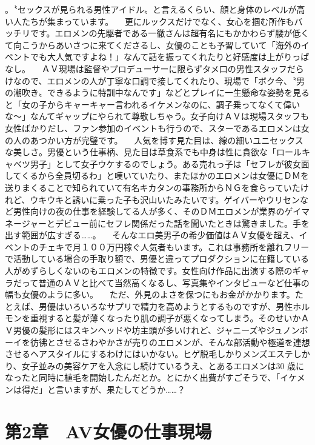 \documentclass[12pt,UTF8]{ctexbook}
\begin{document}
。〝セックスが見られる男性アイドル〟と言えるくらい、顔と身体のレベルが高い人たちが集まっています。
　更にルックスだけでなく、女心を掴む所作もバッチリです。エロメンの先駆者である一徹さんは超有名にもかかわらず腰が低くて向こうからあいさつに来てくださるし、女優のことも予習していて「海外のイベントでも大人気ですよね！」なんて話を振ってくれたりと好感度は上がりっぱなし。
　ＡＶ現場は監督やプロデューサーに限らずタメ口の男性スタッフだらけなので、エロメンの人が丁寧な口調で接してくれたり、現場で「ボク今、〝男の潮吹き〟できるように特訓中なんです」などとプレイに一生懸命な姿勢を見ると「女の子からキャーキャー言われるイケメンなのに、調子乗ってなくて偉いな〜」なんてギャップにやられて尊敬しちゃう。女子向けＡＶは現場スタッフも女性ばかりだし、ファン参加のイベントも行うので、スターであるエロメンは女の人のあつかい方が完璧です。
　人気を博す見た目は、線の細いユニセックスな美しさ。男優という仕事柄、見た目は草食系でも中身は性に貪欲な「ロールキャベツ男子」として女子ウケするのでしょう。ある売れっ子は「セフレが彼女面してくるから全員切るわ」と嘆いていたり、またほかのエロメンは女優にＤＭを送りまくることで知られていて有名キカタンの事務所からＮＧを食らっていたけれど、ウキウキと誘いに乗った子も沢山いたみたいです。ゲイバーやウリセンなど男性向けの夜の仕事を経験してる人が多く、そのＤＭエロメンが業界のゲイマネージャーとデビュー前にセフレ関係だった話を聞いたときは驚きました。手を出す範囲が広すぎる……。
　そんなエロ美男子の希少価値はＡＶ女優を超え、イベントのチェキで月１００万円稼ぐ人気者もいます。これは事務所を離れフリーで活動している場合の手取り額で、男優と違ってプロダクションに在籍している人がめずらしくないのもエロメンの特徴です。女性向け作品に出演する際のギャラだって普通のＡＶと比べて当然高くなるし、写真集やインタビューなど仕事の幅も女優のように多い。
　ただ、外見のよさを保つにもお金がかかります。たとえば、男優はいろいろなサプリで精力を高めようとするものですが、男性ホルモンを重視すると髪が薄くなったり肌の調子が悪くなってしまう。そのせいかＡＶ男優の髪形にはスキンヘッドや坊主頭が多いけれど、ジャニーズやジュノンボーイを彷彿とさせるさわやかさが売りのエロメンが、そんな部活動や極道を連想させるヘアスタイルにするわけにはいかない。ヒゲ脱毛しかりメンズエステしかり、女子並みの美容ケアを入念にし続けているうえ、とあるエロメンは30
 歳になったと同時に植毛を開始したんだとか。とにかく出費がすごそうで、「イケメンは得だ」と言いますが、果たしてどうか……？

\chapter{第2章　AV女優の仕事現場}
\end{document}
